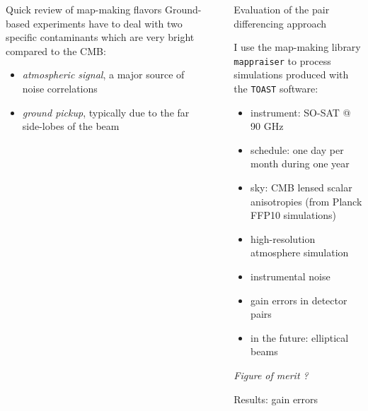 \documentclass[final]{beamer}
\newlength{\sepwidth}
\newlength{\colwidth}
\newcommand{\separatorcolumn}{\begin{column}{\sepwidth}\end{column}}
\begin{document}
\begin{frame}[t]
\begin{columns}[t]
\begin{column}{\colwidth}
\begin{alertblock}{Quick review of map-making flavors}
        Ground-based experiments have to deal with two specific contaminants which are very bright compared to the CMB:

        \begin{itemize}
          \item \emph{atmospheric signal}, a major source of noise correlations
          \item \emph{ground pickup}, typically due to the far side-lobes of the beam
        \end{itemize}


      \end{alertblock}

    \end{column}

    \separatorcolumn

    \begin{column}{\colwidth}

      \begin{block}{Evaluation of the pair differencing approach}

        I use the map-making library \texttt{mappraiser}\cite{ElBouhargani:2021umq} to process simulations produced with the \texttt{TOAST} software:
        \begin{itemize}
          \item instrument: SO-SAT @ 90 GHz
          \item schedule: one day per month during one year
          \item sky: CMB lensed scalar anisotropies (from Planck FFP10 simulations)
          \item high-resolution atmosphere simulation
          \item instrumental noise
          \item gain errors in detector pairs
          \item in the future: elliptical beams
        \end{itemize}

        \emph{Figure of merit ?}

      \end{block}

      \begin{block}{Results: gain errors}


\end{block}
\end{column}
\end{columns}
\end{frame}
\end{document}
